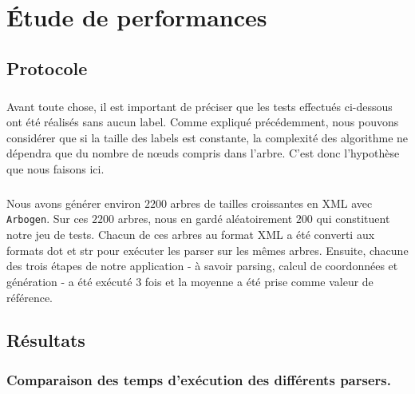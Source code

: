 \chapter{Étude de performances}

	\section{Protocole}

\paragraph{} Avant toute chose, il est important de préciser que les tests effectués ci-dessous ont été réalisés sans aucun label. Comme expliqué précédemment, nous pouvons considérer que si la taille des labels est constante, la complexité des algorithme ne dépendra que du nombre de n\oe uds compris dans l'arbre. C'est donc l'hypothèse que nous faisons ici.

\paragraph{} Nous avons générer environ $2200$ arbres de tailles croissantes en XML avec \verb|Arbogen|. Sur ces $2200$ arbres, nous en gardé aléatoirement $200$ qui constituent notre jeu de tests. Chacun de ces arbres au format XML a été converti aux formats dot et str pour exécuter les parser sur les mêmes arbres. Ensuite, chacune des trois étapes de notre application - à savoir parsing, calcul de coordonnées et génération - a été exécuté $3$ fois et la moyenne a été prise comme valeur de référence.

	\section{Résultats}

	\subsection{Comparaison des temps d'exécution des différents parsers.}
	
